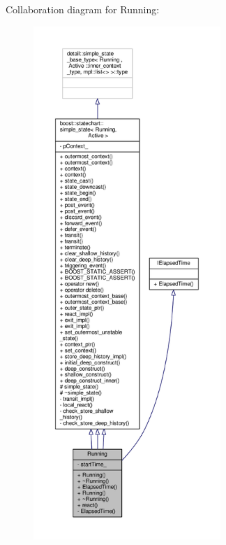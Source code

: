 Collaboration diagram for Running\+:
\nopagebreak
\begin{figure}[H]
\begin{center}
\leavevmode
\includegraphics[height=550pt]{struct_running__coll__graph}
\end{center}
\end{figure}
